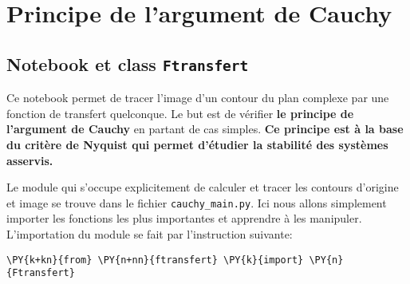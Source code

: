 \chapter{Principe de l'argument de Cauchy~\label{annexe-cauchy}}
\section{Notebook et class \texttt{Ftransfert}\label{principe-de-largument-de-cauchy}}
Ce notebook permet de tracer l'image d'un contour du plan complexe par
une fonction de transfert quelconque. Le but est de vérifier \textbf{le
principe de l'argument de Cauchy} en partant de cas simples. \textbf{Ce
principe est à la base du critère de Nyquist qui permet d'étudier la
stabilité des systèmes asservis.}
\begin{center}

\end{center}
Le module qui s'occupe explicitement de calculer et tracer les contours
d'origine et image se trouve dans le fichier \texttt{cauchy\_main.py}.
Ici nous allons simplement importer les fonctions les plus importantes
et apprendre à les manipuler.
L'importation du module se fait par l'instruction suivante:
\begin{tcolorbox}[breakable, size=fbox, boxrule=1pt, pad at break*=1mm,colback=cellbackground, colframe=cellborder]
\begin{Verbatim}[commandchars=\\\{\}]
\PY{k+kn}{from} \PY{n+nn}{ftransfert} \PY{k}{import} \PY{n}{Ftransfert}
\end{Verbatim}
\end{tcolorbox}

